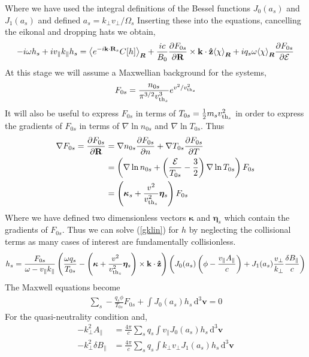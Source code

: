 \documentclass[prb,aps,amssymb,amsmath,a4paper]{revtex4}
\begin{document}
Where we have used the integral definitions of the Bessel functions $J_0(a_s)$ and $J_1(a_s)$ and defined $a_s = k_\perp v_\perp / \Omega_s$
	Inserting these into the equations, cancelling the eikonal and dropping hats we obtain,
\begin{align}
\label{gklin}
-i\omega h_s + iv_\parallel k_\parallel h_s = {\left<  e^{-i\mathbf{k}\cdot\mathbf{R}_s} {C}\hspace{-0.5mm}\left[ h \right]  \right>}_{\bm{R}} + \frac{ic}{B_0} \frac{\partial F_{0s}} {\partial \mathbf{R}}  \times \mathbf{k} \cdot \mathbf{\hat{z}} {\left< \chi \right>}_{\bm{R}} + i q_s \omega {\left< \chi \right>}_{\bm{R}}  \frac{\partial F_{0s}} {\partial \mathcal{E}} 
\end{align}
At this stage we will assume a Maxwellian background for the systems, 
				\[
				F_{0s} = \frac{n_{0s}}{\pi^{3/2} v_{\mathrm{th}_s}^3} e^{v^2/v_{\mathrm{th}_s}^2}
				\]
It will also be useful to express $F_{0s}$ in terms of $T_{0s} = \frac{1}{2} m_s v_{\mathrm{th}_s}^2$ in order to express the gradients of $F_{0s}$ in terms of $\nabla \ln n_{0s}$ and $\nabla \ln T_{0s}$. Thus
\begin{align}
\nonumber
\nabla F_{0s} =  \frac{\partial F_{0s}} {\partial \mathbf{R}}  &= \nabla n_{0s}  \frac{\partial F_{0s}} {\partial n}  + \nabla T_{0s}  \frac{\partial F_{0s}} {\partial T}  \\\nonumber
&= \left( \nabla \ln n_{0s} + \left( \frac{\mathcal{E}}{T_{0s}} - \frac{3}{2} \right) \nabla \ln T_{0s} \right) F_{0s}\\ \nonumber
&= \left( \bm{\kappa}_{s} + \frac{v^2}{v_{\mathrm{th}_s}^2} \bm{\eta}_{s} \right) F_{0s}
\end{align}
Where we have defined two dimensionless vectors $\bm{\kappa}$ and $\bm{\eta}_s$ which contain the gradients of $F_{0s}$.
Thus we can solve (\ref{gklin}) for $h$ by neglecting the collisional terms as  many cases of interest are fundamentally collisionless.
\begin{align}
h_s = \frac{F_{0s}}{\omega - v_\parallel k_\parallel } \left(\frac{\omega q_s}{T_{0s}} - \left(\bm{\kappa} + \frac{v^2}{v_{\mathrm{th}_s}^2} \bm{\eta}_s \right) \times \mathbf{k} \cdot \mathbf{\hat{z}} \right) \left(J_0(a_s) \left( \phi - \frac{v_\parallel A_\parallel}{c} \right) + J_1(a_s) \frac{v_\perp}{k_\perp} \frac{\delta B_\parallel }{c} \right)
\end{align}
The Maxwell equations become 
\begin{align}
\label{gkqnlin}
\sum\limits_{s} - \frac{ q_s \phi}{T_{0s}}{F_{0s}}  + \int J_0(a_s){h_s} \, \mathrm{d}^3\mathbf{v} = 0
\end{align}
For the quasi-neutrality condition and,
\begin{align}
\label{gkampparlin}
- k_\perp^2 A_\parallel &= \frac{4\pi}{c} \sum\limits_s q_s \int v_\parallel J_0(a_s){h_s} \, \mathrm{d}^3\mathbf{v}
\\
\label{gkampperplin}
- k_{\perp}^2 \delta B_\parallel &= \frac{4\pi}{c} \sum\limits_s q_s \int k_\perp v_\perp J_1(a_s) {h_s} \, \mathrm{d}^3\mathbf{v}
\end{align}
\end{document}
